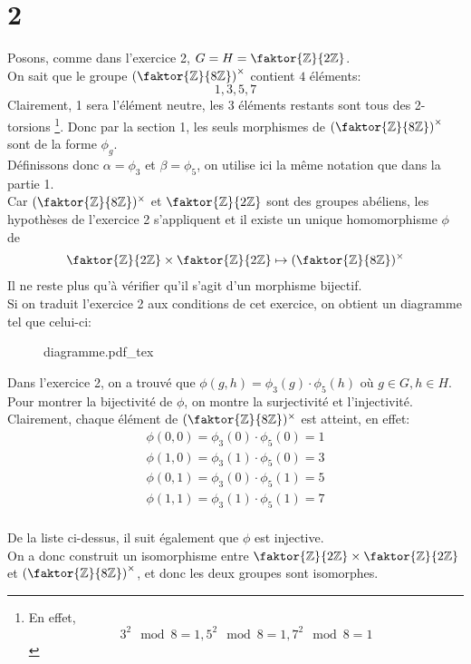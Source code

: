 \documentclass[11pt, a4paper, twoside]{article}
\newcommand{\incfig}[2][1]{%
    \def\svgwidth{#1\columnwidth}
    {#2.pdf_tex}
}
\begin{document}
\section*{2}
Posons, comme dans l'exercice 2, $G=H=\faktor { \mathbb{Z}} { 2\mathbb{Z}}$.\\
On sait que le groupe $\left( \faktor { \mathbb{Z}} { 8\mathbb{Z}} \right)^{\times} $ contient $4$ éléments:
\[ 
1,3,5,7
\]
Clairement, 1 sera l'élément neutre, les 3 éléments restants sont tous des 2-torsions \footnote{En effet,
\[ 
3^2 \mod 8 = 1 , 5^2 \mod 8 = 1, 7^2\mod 8 = 1
\]
}. Donc par la section 1, les seuls morphismes de $\left( \faktor { \mathbb{Z}} { 8\mathbb{Z}} \right)^{\times}$ sont de la forme $\phi_g$.\\
Définissons donc $\alpha = \phi_3$ et $\beta= \phi_5$, on utilise ici la même notation que dans la partie 1.\\
Car $( \faktor { \mathbb{Z}} { 8\mathbb{Z}} )^{\times}$ et $\faktor { \mathbb{Z}} { 2\mathbb{Z}} $ sont des groupes abéliens, les hypothèses de l'exercice 2 s'appliquent et il existe un unique homomorphisme $\phi$ de
\begin{align*}
\faktor { \mathbb{Z}} { 2\mathbb{Z}} \times \faktor { \mathbb{Z}} { 2\mathbb{Z}} \mapsto ( \faktor { \mathbb{Z}} { 8\mathbb{Z}} )^{\times}
\end{align*}
Il ne reste plus qu'à vérifier qu'il s'agit d'un morphisme bijectif.\\
Si on traduit l'exercice 2 aux conditions de cet exercice, on obtient un diagramme tel que celui-ci:\\
\begin{figure}[h]
    \centering
    \incfig{diagramme}
\end{figure}



Dans l'exercice 2, on a trouvé que $\phi(g,h) = \phi_3( g) \cdot \phi_5( h)$ où $g \in G, h \in H$. \\
Pour montrer la bijectivité de $\phi$, on montre la surjectivité et l'injectivité.\\
Clairement, chaque élément de $( \faktor { \mathbb{Z}} { 8\mathbb{Z}} )^{\times}$ est atteint, en effet:
\begin{align*}
	\phi(0,0) = \phi_3(0 )  \cdot \phi_5( 0) = 1\\
	\phi(1,0) = \phi_3(1 )  \cdot \phi_5( 0) = 3\\
	\phi(0,1) = \phi_3(0 )  \cdot \phi_5( 1) = 5\\
	\phi(1,1) = \phi_3(1 )  \cdot \phi_5( 1) = 7\\
\end{align*}

De la liste ci-dessus, il suit également que $\phi$ est injective.\\
On a donc construit un isomorphisme entre $ \faktor{\mathbb{Z}}{2 \mathbb{Z}} \times\faktor{\mathbb{Z}}{2 \mathbb{Z}}$ et $ \left( \faktor{\mathbb{Z}}{8\mathbb{Z}} \right)^\times$, et donc les deux groupes sont isomorphes.
\end{document}
